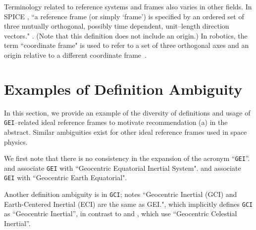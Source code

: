 \documentclass[draft]{agujournal2019}
\begin{document}

Terminology related to reference systems and frames also varies in other fields. In SPICE \cite{NAIFGeneral2025}, ``a reference frame (or simply `frame') is specified by an ordered set of three mutually orthogonal, possibly time dependent, unit--length direction vectors." \cite{NAIFOverview2023}. (Note that this definition does not include an origin.) In robotics, the term ``coordinate frame" is used to refer to a set of three orthogonal axes and an origin relative to a different coordinate frame~\cite{Murray2017}. 

\section{Examples of Definition Ambiguity}
\label{sect:definitions}

In this section, we provide an example of the diversity of definitions and usage of \texttt{GEI}--related ideal reference frames to motivate recommendation (a) in the abstract. Similar ambiguities exist for other ideal reference frames used in space physics.

We first note that there is no consistency in the expansion of the acronym ``\texttt{GEI}''.  and  associate \texttt{GEI} with ``Geocentric Equatorial Inertial System".  and  associate \texttt{GEI} with ``Geocentric Earth Equatorial".

Another definition ambiguity is in \texttt{GCI};  notes ``Geocentric Inertial (GCI) and Earth-Centered Inertial (ECI) are the same as GEI.", which implicitly defines \texttt{GCI} as ``Geocentric Inertial'', in contrast to  and
, which use ``Geocentric Celestial Inertial''. 
\end{document}
